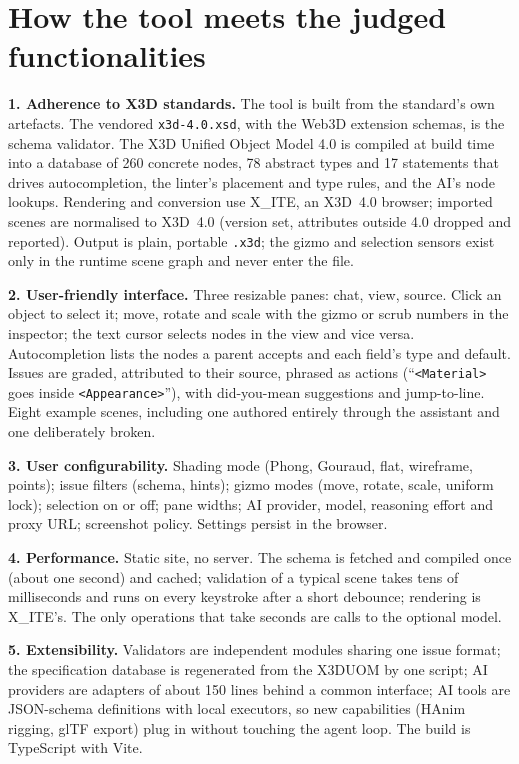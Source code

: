 \documentclass[10pt,a4paper,twocolumn]{article}
\begin{document}
\section{How the tool meets the judged functionalities}
\textbf{1. Adherence to X3D standards.} The tool is built from the standard's own artefacts. The vendored \texttt{x3d-4.0.xsd}, with the Web3D extension schemas, is the schema validator. The X3D Unified Object Model 4.0 is compiled at build time into a database of 260 concrete nodes, 78 abstract types and 17 statements that drives autocompletion, the linter's placement and type rules, and the AI's node lookups. Rendering and conversion use X\_ITE, an X3D~4.0 browser; imported scenes are normalised to X3D~4.0 (version set, attributes outside 4.0 dropped and reported). Output is plain, portable \texttt{.x3d}; the gizmo and selection sensors exist only in the runtime scene graph and never enter the file.

\textbf{2. User-friendly interface.} Three resizable panes: chat, view, source. Click an object to select it; move, rotate and scale with the gizmo or scrub numbers in the inspector; the text cursor selects nodes in the view and vice versa. Autocompletion lists the nodes a parent accepts and each field's type and default. Issues are graded, attributed to their source, phrased as actions (``\texttt{<Material>} goes inside \texttt{<Appearance>}''), with did-you-mean suggestions and jump-to-line. Eight example scenes, including one authored entirely through the assistant and one deliberately broken.

\textbf{3. User configurability.} Shading mode (Phong, Gouraud, flat, wireframe, points); issue filters (schema, hints); gizmo modes (move, rotate, scale, uniform lock); selection on or off; pane widths; AI provider, model, reasoning effort and proxy URL; screenshot policy. Settings persist in the browser.

\textbf{4. Performance.} Static site, no server. The schema is fetched and compiled once (about one second) and cached; validation of a typical scene takes tens of milliseconds and runs on every keystroke after a short debounce; rendering is X\_ITE's. The only operations that take seconds are calls to the optional model.

\textbf{5. Extensibility.} Validators are independent modules sharing one issue format; the specification database is regenerated from the X3DUOM by one script; AI providers are adapters of about 150 lines behind a common interface; AI tools are JSON-schema definitions with local executors, so new capabilities (HAnim rigging, glTF export) plug in without touching the agent loop. The build is TypeScript with Vite.
\end{document}
